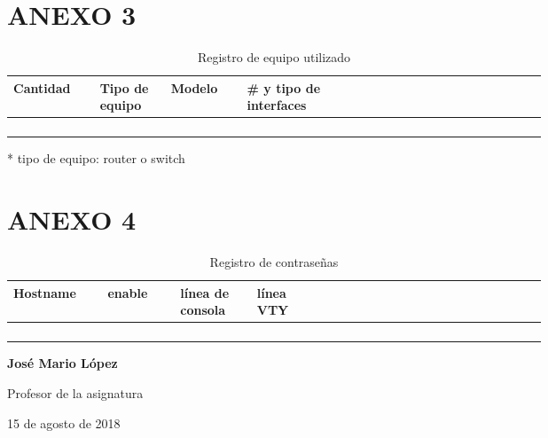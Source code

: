 \documentclass[12pt]{article}
\begin{document}
\section{ANEXO 3}
\begin{table}[ht]
\centering
\caption{Registro de equipo utilizado}
\begin{tabular}{|p{0.10\linewidth}|p{0.10\linewidth}|p{0.10\linewidth}|p{0.10\linewidth}|p{0.10\linewidth}|p{0.10\linewidth}|p{0.10\linewidth}|}
\hline
\rowcolor[HTML]{C0C0C0} 
Cantidad & Tipo de equipo & Modelo & \# y tipo de interfaces\\ \hline
          &                  &                        &               \\ \hline
          &                  &                        &                    \\ \hline
          &                  &                        &                   \\ \hline
          &                  &                        &                   \\ \hline
\end{tabular}
\end{table}
* tipo de equipo: router o switch

\section{ANEXO 4}
\begin{table}[ht]
\centering
\caption{Registro de contraseñas}
\begin{tabular}{|p{0.10\linewidth}|p{0.10\linewidth}|p{0.10\linewidth}|p{0.10\linewidth}|p{0.10\linewidth}|p{0.10\linewidth}|p{0.10\linewidth}|}
\hline
\rowcolor[HTML]{C0C0C0} 
Hostname & enable & línea de consola & línea VTY\\ \hline
          &                  &                        &               \\ \hline
          &                  &                        &                    \\ \hline
          &                  &                        &                   \\ \hline
          &                  &                        &                   \\ \hline
\end{tabular}
\end{table}
\vfill
{\textbf {\normalsize José Mario López}}

{\small Profesor de la asignatura\\}

{\footnotesize 
15 de agosto de 2018
}
\end{document}
